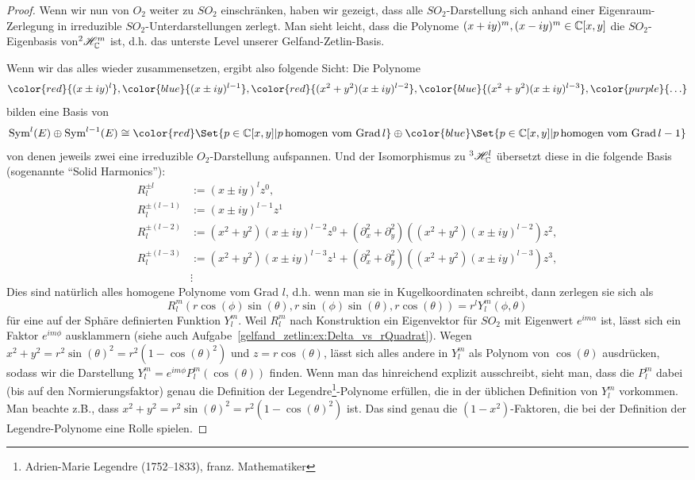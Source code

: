 \begin{proof}
\medbreak
Wenn wir nun von $O_2$ weiter zu $SO_2$ einschränken, haben wir gezeigt, dass alle $SO_2$-Darstellung sich anhand einer Eigenraum-Zerlegung in irreduzible $SO_2$-Unterdarstellungen zerlegt. Man sieht leicht, dass die Polynome $(x+iy)^m, (x-iy)^m\in\mathbb{C}[x,y]$ die $SO_2$-Eigenbasis von${^2 \mathscr{H}_{\mathbb{C}}^m}$ ist, d.h. das unterste Level unserer Gelfand-Zetlin-Basis.

\medbreak
Wenn wir das alles wieder zusammensetzen, ergibt also folgende Sicht: Die Polynome
\[\color{red}{(x\pm iy)^l}, \color{blue}{(x\pm iy)^{l-1}}, \color{red}{(x^2+y^2)(x\pm iy)^{l-2}}, \color{blue}{(x^2+y^2)(x\pm iy)^{l-3}}, \color{purple}{\ldots}\]
bilden eine Basis von
\[\Sym^l(E) \oplus \Sym^{l-1}(E) \isomorphic {\color{red}\Set{p \in\IC[x,y] | p\,\text{homogen vom Grad}\,l}} \oplus {\color{blue}\Set{p \in\IC[x,y] | p\,\text{homogen vom Grad}\,l-1}}\]
von denen jeweils zwei eine irreduzible $O_2$-Darstellung aufspannen. Und der Isomorphismus zu ${^3\mathscr{H}_{\mathbb{C}}^l}$ übersetzt diese in die folgende Basis (sogenannte \enquote{Solid Harmonics}):
\begin{align*}
R_l^{\pm l} &:= (x\pm iy)^l z^0,\\
R_l^{\pm(l-1)} &:= (x\pm iy)^{l-1}z^1 \\
R_l^{\pm(l-2)} &:= (x^2+y^2)(x\pm iy)^{l-2}z^0 + (\partial_x^2+\partial_y^2)\left((x^2+y^2)(x\pm iy)^{l-2}\right)z^2,\\
R_l^{\pm(l-3)} &:= (x^2+y^2)(x\pm iy)^{l-3}z^1 + (\partial_x^2+\partial_y^2)\left((x^2+y^2)(x\pm iy)^{l-3}\right)z^3, \\
&\vdots
\end{align*}
Dies sind natürlich alles homogene Polynome vom Grad $l$, d.h. wenn man sie in Kugelkoordinaten schreibt, dann zerlegen sie sich als
\[R_l^m(r\cos(\phi)\sin(\theta), r\sin(\phi)\sin(\theta), r\cos(\theta)) = r^l Y_l^m(\phi,\theta)\]
für eine auf der Sphäre definierten Funktion $Y_l^m$. Weil $R_l^m$ nach Konstruktion ein Eigenvektor für $SO_2$ mit Eigenwert $e^{im\alpha}$ ist, lässt sich ein Faktor $e^{im\phi}$ ausklammern (siehe auch Aufgabe~\ref{gelfand_zetlin:ex:Delta_vs_rQuadrat}). Wegen $x^2+y^2=r^2 \sin(\theta)^2 = r^2(1-\cos(\theta)^2)$ und $z=r\cos(\theta)$, lässt sich alles andere in $Y_l^m$ als Polynom von $\cos(\theta)$ ausdrücken, sodass wir die Darstellung $Y_l^m = e^{im\phi} P_l^m(\cos(\theta))$ finden. Wenn man das hinreichend explizit ausschreibt, sieht man, dass die $P_l^m$ dabei (bis auf den Normierungsfaktor) genau die Definition der Legendre\footnote{Adrien-Marie Legendre (1752–1833), franz. Mathematiker}-Polynome erfüllen, die in der üblichen Definition von $Y_l^m$ vorkommen. Man beachte z.B., dass $x^2+y^2 = r^2\sin(\theta)^2 = r^2(1-\cos(\theta)^2)$ ist. Das sind genau die $(1-x^2)$-Faktoren, die bei der Definition der Legendre-Polynome eine Rolle spielen.


\end{proof}
